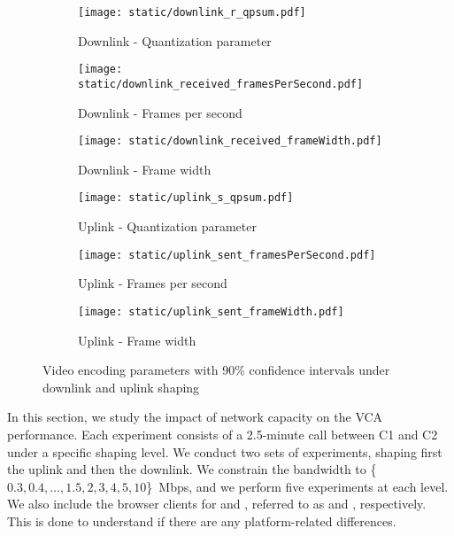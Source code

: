 \begin{figure*}[]
    \begin{subfigure}[t]{0.33\textwidth}      
    		\centering
        \texttt{[image: static/downlink\_r\_qpsum.pdf]}
        \caption{Downlink - Quantization parameter}
 		\label{subfig:downlink_video_qp}
    \end{subfigure}%
    \hfill
	\begin{subfigure}[t]{0.33\textwidth}   
        \centering
        \texttt{[image: static/downlink\_received\_framesPerSecond.pdf]}
    \caption{Downlink - Frames per second}
    \label{subfig:downlink_frames_per_second}
    \end{subfigure}%
    \hfill
	\begin{subfigure}[t]{0.33\textwidth}   
        \centering
        \texttt{[image: static/downlink\_received\_frameWidth.pdf]}
    \caption{Downlink - Frame width}
    \label{subfig:downlink_frame_width}
    \end{subfigure}
    \newline
        \begin{subfigure}[t]{0.33\textwidth}      
    		\centering
        \texttt{[image: static/uplink\_s\_qpsum.pdf]}
        \caption{Uplink - Quantization parameter}
 		\label{subfig:uplink_video_qp}
    \end{subfigure}%
    \hfill
	\begin{subfigure}[t]{0.33\textwidth}   
        \centering
        \texttt{[image: static/uplink\_sent\_framesPerSecond.pdf]}
    \caption{Uplink - Frames per second}
    \label{subfig:uplink_frames_per_second}
    \end{subfigure}%
    \hfill
	\begin{subfigure}[t]{0.33\textwidth}   
        \centering
        \texttt{[image: static/uplink\_sent\_frameWidth.pdf]}
    \caption{Uplink - Frame width}
    \label{subfig:uplink_frame_width}
    \end{subfigure}
	\caption{Video encoding parameters with 90\% confidence intervals under downlink and uplink shaping}
	\label{fig:video_qual}
\end{figure*}



In this section, we study the impact of network capacity on the VCA performance. Each experiment consists of a 2.5-minute call between C1 and C2 under a specific shaping level. We conduct two sets of experiments, shaping first the uplink and then the downlink.  We constrain the bandwidth to \{$0.3, 0.4, \dots, 1.5, 2, 3, 4, 5, 10$\}~Mbps, and we perform five experiments at each level.  We also include the browser clients for \zoom and \teams, referred to as \zoombrowser and \teamsbrowser, respectively. This is done to understand if there are any platform-related differences. 

